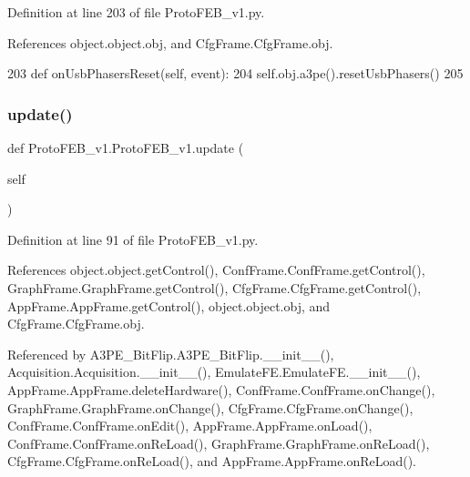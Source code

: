 Definition at line 203 of file Proto\+F\+E\+B\+\_\+v1.\+py.



References object.\+object.\+obj, and Cfg\+Frame.\+Cfg\+Frame.\+obj.


\begin{DoxyCode}
203     \textcolor{keyword}{def }onUsbPhasersReset(self, event):
204         self.obj.a3pe().resetUsbPhasers()
205 
\end{DoxyCode}
\mbox{\label{classProtoFEB__v1_1_1ProtoFEB__v1_a659da21751fdb6a04fbdce9862ca0043}} 
\subsubsection{\texorpdfstring{update()}{update()}}
{\footnotesize\ttfamily def Proto\+F\+E\+B\+\_\+v1.\+Proto\+F\+E\+B\+\_\+v1.\+update (\begin{DoxyParamCaption}\item[{}]{self }\end{DoxyParamCaption})}



Definition at line 91 of file Proto\+F\+E\+B\+\_\+v1.\+py.



References object.\+object.\+get\+Control(), Conf\+Frame.\+Conf\+Frame.\+get\+Control(), Graph\+Frame.\+Graph\+Frame.\+get\+Control(), Cfg\+Frame.\+Cfg\+Frame.\+get\+Control(), App\+Frame.\+App\+Frame.\+get\+Control(), object.\+object.\+obj, and Cfg\+Frame.\+Cfg\+Frame.\+obj.



Referenced by A3\+P\+E\+\_\+\+Bit\+Flip.\+A3\+P\+E\+\_\+\+Bit\+Flip.\+\_\+\+\_\+init\+\_\+\+\_\+(), Acquisition.\+Acquisition.\+\_\+\+\_\+init\+\_\+\+\_\+(), Emulate\+F\+E.\+Emulate\+F\+E.\+\_\+\+\_\+init\+\_\+\+\_\+(), App\+Frame.\+App\+Frame.\+delete\+Hardware(), Conf\+Frame.\+Conf\+Frame.\+on\+Change(), Graph\+Frame.\+Graph\+Frame.\+on\+Change(), Cfg\+Frame.\+Cfg\+Frame.\+on\+Change(), Conf\+Frame.\+Conf\+Frame.\+on\+Edit(), App\+Frame.\+App\+Frame.\+on\+Load(), Conf\+Frame.\+Conf\+Frame.\+on\+Re\+Load(), Graph\+Frame.\+Graph\+Frame.\+on\+Re\+Load(), Cfg\+Frame.\+Cfg\+Frame.\+on\+Re\+Load(), and App\+Frame.\+App\+Frame.\+on\+Re\+Load().


